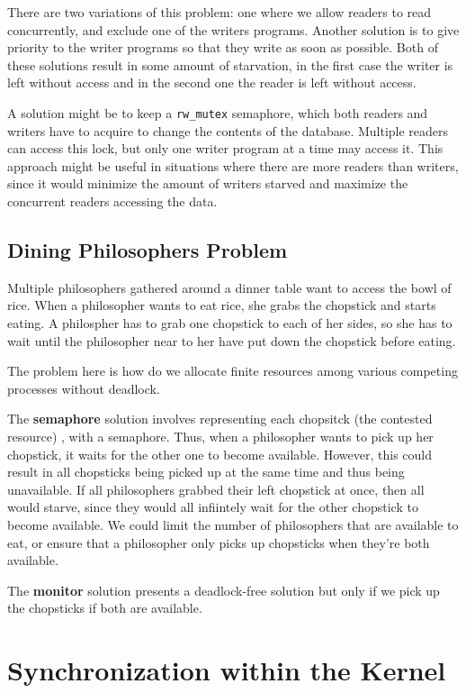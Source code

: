 \documentclass{tufte-handout}
\begin{document}
There are two variations of this problem: one where we allow readers to read 
concurrently, and exclude one of the writers programs. Another solution is to give
priority to the writer programs so that they write as soon as possible. Both of these
solutions result in some amount of starvation, in the first case the writer is left
without access and in the second one the reader is left without access.

A solution might be to keep a \texttt{rw\_mutex} semaphore, which both readers and 
writers have to acquire to change the contents of the database. Multiple readers can
access this lock, but only one writer program at a time may access it. This approach might
be useful in situations where there are more readers than writers, since it would minimize
the amount of writers starved and maximize the concurrent readers accessing the data.

\subsection{Dining Philosophers Problem}
Multiple philosophers gathered around a dinner table want to access the bowl of rice.
When a philosopher wants to eat rice, she grabs the chopstick and starts eating. 
A philospher has to grab one chopstick to each of her sides, so she has to wait until
the philosopher near to her have put down the chopstick before eating. 

The problem here is how do we allocate finite resources among various competing processes
without deadlock.

The \textbf{semaphore} solution involves representing each chopsitck (the contested resource)
, with a semaphore. Thus, when a philosopher wants to pick up her chopstick, it waits
for the other one to become available. However, this could result in all chopsticks being
picked up at the same time and thus being unavailable. If all philosophers grabbed their
left chopstick at once, then all would starve, since they would all infiintely wait
for the other chopstick to become available. We could limit the number of philosophers
that are available to eat, or ensure that a philosopher only picks up chopsticks
when they're both available.

The \textbf{monitor} solution presents a deadlock-free solution but only if we pick 
up the chopsticks if both are available.
\section{Synchronization within the Kernel}
\end{document}
